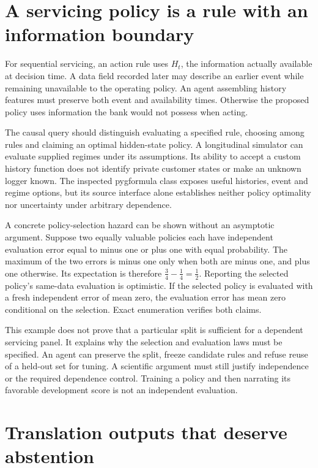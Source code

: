 \section{A servicing policy is a rule with an information boundary}

For sequential servicing, an action rule uses $H_t$, the information actually
available at decision time. A data field recorded later may describe an earlier
event while remaining unavailable to the operating policy. An agent assembling
history features must preserve both event and availability times. Otherwise
the proposed policy uses information the bank would not possess when acting.

The causal query should distinguish evaluating a specified rule, choosing among
rules and claiming an optimal hidden-state policy. A longitudinal simulator can
evaluate supplied regimes under its assumptions. Its ability to accept a custom
history function does not identify private customer states or make an unknown
logger known. The inspected pygformula class exposes useful histories, event
and regime options, but its source interface alone establishes neither policy
optimality nor uncertainty under arbitrary dependence. \cite{v13_sw_pygformula}

A concrete policy-selection hazard can be shown without an asymptotic argument.
Suppose two equally valuable policies each have independent evaluation error
equal to minus one or plus one with equal probability. The maximum of the two
errors is minus one only when both are minus one, and plus one otherwise.
Its expectation is therefore $\tfrac34-\tfrac14=\tfrac12$. Reporting the
selected policy's same-data evaluation is optimistic. If the selected policy
is evaluated with a fresh independent error of mean zero, the evaluation error
has mean zero conditional on the selection. Exact enumeration verifies both
claims. \cite{v13_project_exact}

This example does not prove that a particular split is sufficient for a
dependent servicing panel. It explains why the selection and evaluation laws
must be specified. An agent can preserve the split, freeze candidate rules and
refuse reuse of a held-out set for tuning. A scientific argument must still
justify independence or the required dependence control. Training a policy
and then narrating its favorable development score is not an independent
evaluation.

\section{Translation outputs that deserve abstention}

